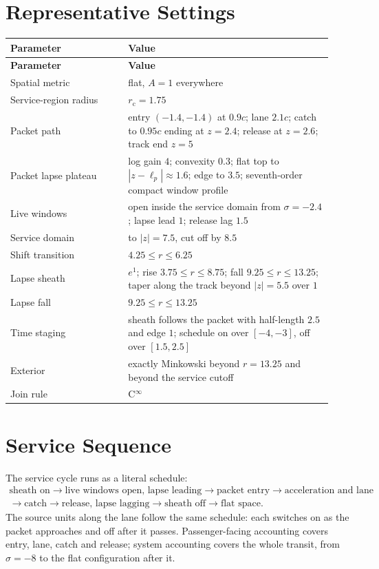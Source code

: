 \documentclass[11pt]{article}
\newcommand{\sig}{\sigma}
\newcommand{\rc}{r_{\mathrm c}}
\begin{document}
\section{Representative Settings}

\begin{longtable}{L{0.34\linewidth}L{0.59\linewidth}}
\toprule
\textbf{Parameter} & \textbf{Value} \\
\midrule
\endfirsthead
\toprule
\textbf{Parameter} & \textbf{Value} \\
\midrule
\endhead
Spatial metric & flat, $A=1$ everywhere \\
Service-region radius & $\rc=1.75$ \\
Packet path & entry $(-1.4,-1.4)$ at $0.9c$; lane $2.1c$; catch to $0.95c$ ending at $z=2.4$; release at $z=2.6$; track end $z=5$ \\
Packet lapse plateau & log gain $4$; convexity $0.3$; flat top to $|z-\ell_p|\approx1.6$; edge to $3.5$; seventh-order compact window profile \\
Live windows & open inside the service domain from $\sig=-2.4$; lapse lead $1$; release lag $1.5$ \\
Service domain & to $|z|=7.5$, cut off by $8.5$ \\
Shift transition & $4.25\le r\le6.25$ \\
Lapse sheath & $e^{1}$; rise $3.75\le r\le8.75$; fall $9.25\le r\le13.25$; taper along the track beyond $|z|=5.5$ over $1$ \\
Lapse fall & $9.25\le r\le13.25$ \\
Time staging & sheath follows the packet with half-length $2.5$ and edge $1$; schedule on over $[-4,-3]$, off over $[1.5,2.5]$ \\
Exterior & exactly Minkowski beyond $r=13.25$ and beyond the service cutoff \\
Join rule & C$^\infty$ \\
\bottomrule
\end{longtable}

\section{Service Sequence}

The service cycle runs as a literal schedule:
\begin{equation}
\begin{array}{c}
\text{sheath on}\rightarrow\text{live windows open, lapse leading}\rightarrow\text{packet entry}\rightarrow\text{acceleration and lane}\\
\rightarrow\text{catch}\rightarrow\text{release, lapse lagging}\rightarrow\text{sheath off}\rightarrow\text{flat space}.
\end{array}
\end{equation}
The source units along the lane follow the same schedule: each switches on as the packet approaches and off after it passes. Passenger-facing accounting covers entry, lane, catch and release; system accounting covers the whole transit, from $\sig=-8$ to the flat configuration after it.
\end{document}

